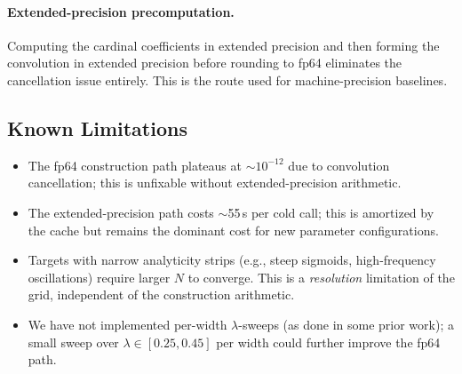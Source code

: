 \documentclass{article}
\begin{document}
\paragraph{Extended-precision precomputation.}
Computing the cardinal coefficients in extended precision and then forming the convolution in extended precision before rounding to fp64 eliminates the cancellation issue entirely.  This is the route used for machine-precision baselines.

\subsection{Known Limitations}
\label{app:limitations}

\begin{itemize}
  \item The fp64 construction path plateaus at \(\sim 10^{-12}\) due to convolution cancellation; this is unfixable without extended-precision arithmetic.
  \item The extended-precision path costs \(\sim\)55\,s per cold call; this is amortized by the cache but remains the dominant cost for new parameter configurations.
  \item Targets with narrow analyticity strips (e.g., steep sigmoids, high-frequency oscillations) require larger \(N\) to converge.  This is a \emph{resolution} limitation of the grid, independent of the construction arithmetic.
  \item We have not implemented per-width \(\lambda\)-sweeps (as done in some prior work); a small sweep over \(\lambda \in [0.25, 0.45]\) per width could further improve the fp64 path.
\end{itemize}
\end{document}
